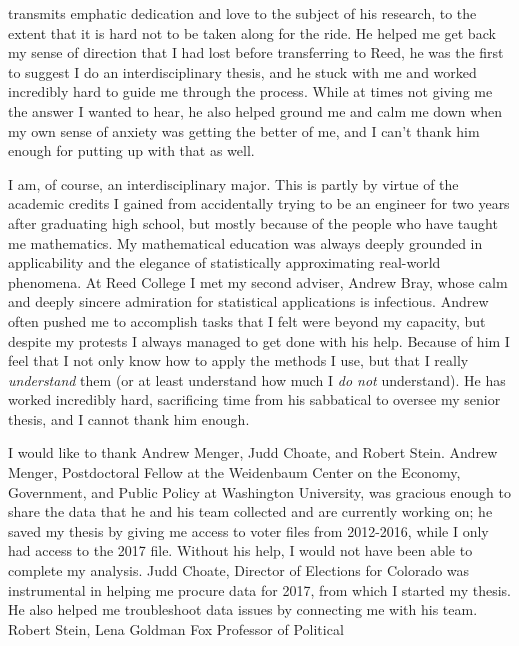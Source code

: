 \documentclass[12pt,twoside]{reedthesis}
\begin{document}
\begin{preface}
      transmits emphatic dedication and love to the subject of his research,
      to the extent that it is hard not to be taken along for the ride. He
      helped me get back my sense of direction that I had lost before
      transferring to Reed, he was the first to suggest I do an
      interdisciplinary thesis, and he stuck with me and worked incredibly
      hard to guide me through the process. While at times not giving me the
      answer I wanted to hear, he also helped ground me and calm me down when
      my own sense of anxiety was getting the better of me, and I can't thank
      him enough for putting up with that as well. \par I am, of course, an
      interdisciplinary major. This is partly by virtue of the academic
      credits I gained from accidentally trying to be an engineer for two
      years after graduating high school, but mostly because of the people who
      have taught me mathematics. My mathematical education was always deeply
      grounded in applicability and the elegance of statistically
      approximating real-world phenomena. At Reed College I met my second
      adviser, Andrew Bray, whose calm and deeply sincere admiration for
      statistical applications is infectious. Andrew often pushed me to
      accomplish tasks that I felt were beyond my capacity, but despite my
      protests I always managed to get done with his help. Because of him I
      feel that I not only know how to apply the methods I use, but that I
      really \emph{understand} them (or at least understand how much I
      \emph{do not} understand). He has worked incredibly hard, sacrificing
      time from his sabbatical to oversee my senior thesis, and I cannot thank
      him enough. \par I would like to thank Andrew Menger, Judd Choate, and
      Robert Stein. Andrew Menger, Postdoctoral Fellow at the Weidenbaum
      Center on the Economy, Government, and Public Policy at Washington
      University, was gracious enough to share the data that he and his team
      collected and are currently working on; he saved my thesis by giving me
      access to voter files from 2012-2016, while I only had access to the
      2017 file. Without his help, I would not have been able to complete my
      analysis. Judd Choate, Director of Elections for Colorado was
      instrumental in helping me procure data for 2017, from which I started
      my thesis. He also helped me troubleshoot data issues by connecting me
      with his team. Robert Stein, Lena Goldman Fox Professor of Political

\end{preface}
\end{document}
